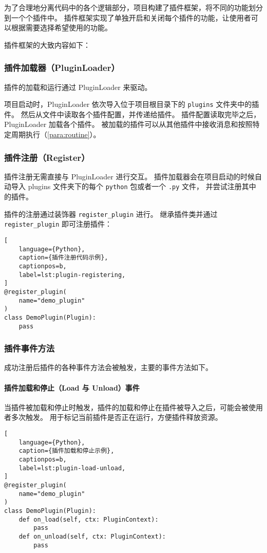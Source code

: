 为了合理地分离代码中的各个逻辑部分，项目构建了插件框架，将不同的功能划分到一个个插件中。
插件框架实现了单独开启和关闭每个插件的功能，让使用者可以根据需要选择希望使用的功能。

插件框架的大致内容如下：

\subsubsection{插件加载器（PluginLoader）}
插件的加载和运行通过 PluginLoader 来驱动。

项目启动时，PluginLoader 依次导入位于项目根目录下的 \verb`plugins` 文件夹中的插件。
然后从文件中读取各个插件配置，并传递给插件。
插件配置读取完毕之后，PluginLoader 加载各个插件。
被加载的插件可以从其他插件中接收消息和按照特定周期执行（\ref{para:routine}）。

\subsubsection{插件注册（Register）}
插件注册无需直接与 PluginLoader 进行交互。
插件加载器会在项目启动的时候自动导入 plugins 文件夹下的每个 \verb`python` 包或者一个 \verb`.py` 文件，
并尝试注册其中的插件。

插件的注册通过装饰器 \verb`register_plugin` 进行。
继承插件类并通过 \verb`register_plugin` 即可注册插件：

\begin{lstlisting}[
    language={Python},
    caption={插件注册代码示例},
    captionpos=b,
    label=lst:plugin-registering,
]
@register_plugin(
    name="demo_plugin"
)
class DemoPlugin(Plugin):
    pass\end{lstlisting}

\subsubsection{插件事件方法}

成功注册后插件的各种事件方法会被触发，主要的事件方法如下。

\paragraph{插件加载和停止（Load 与 Unload）事件}

当插件被加载和停止时触发，插件的加载和停止在插件被导入之后，可能会被使用者多次触发。
用于标记当前插件是否正在运行，方便插件释放资源。


\begin{lstlisting}[
    language={Python},
    caption={插件加载和停止示例},
    captionpos=b,
    label=lst:plugin-load-unload,
]
@register_plugin(
    name="demo_plugin"
)
class DemoPlugin(Plugin):
    def on_load(self, ctx: PluginContext):
        pass
    def on_unload(self, ctx: PluginContext):
        pass\end{lstlisting}

